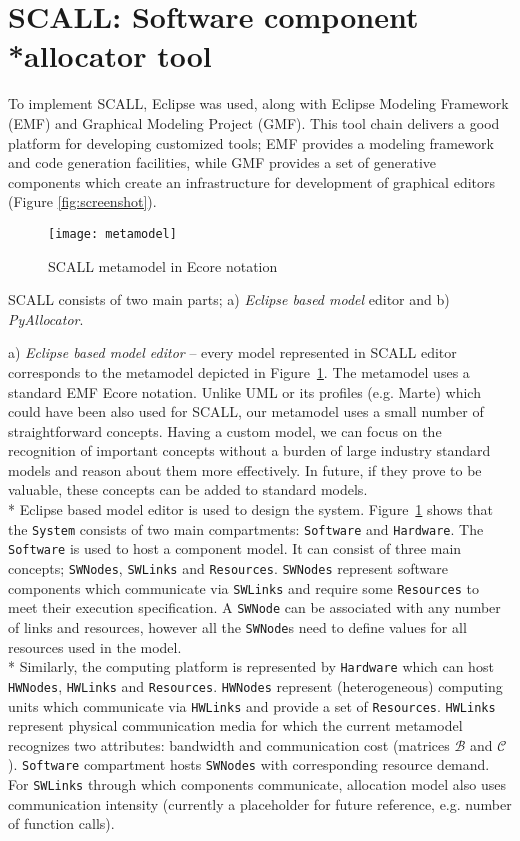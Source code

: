 \documentclass{sig-alternate}
\begin{document}
\section{SCALL: Software component \\*allocator tool}

To implement SCALL, Eclipse was used, along with Eclipse Modeling Framework (EMF) and Graphical Modeling Project (GMF). This tool chain delivers a good platform for developing customized tools; EMF provides a modeling framework and code generation facilities, while GMF provides a set of generative components which create an infrastructure for development of graphical editors (Figure \ref{fig:screenshot}). 

\begin{figure}[ht]
    \centering
		\texttt{[image: metamodel]}
    \caption{SCALL metamodel in Ecore notation}
    \label{fig:metamodel}
\end{figure}

SCALL consists of two main parts; a) \textsl{Eclipse based model} editor and b) \textsl{PyAllocator}.

 a) \textit{Eclipse based model editor} -- every model represented in SCALL editor corresponds to the metamodel depicted in Figure~\ref{fig:metamodel}. The metamodel uses a standard EMF Ecore notation. Unlike UML or its profiles (e.g. Marte) which could have been also used for SCALL, our metamodel uses a small number of straightforward concepts. Having a custom model, we can focus on the recognition of important concepts without a burden of large industry standard models and reason about them more effectively. In future, if they prove to be valuable, these concepts can be added to standard models. 
\\*
Eclipse based model editor is used to design the system. Figure~\ref{fig:metamodel} shows that the \texttt{System} consists of two main compartments: \texttt{Software} and \texttt{Hardware}. The \texttt{Software} is used to host a component model. It can consist of three main concepts; \texttt{SWNodes}, \texttt{SWLinks} and \texttt{Resources}. 
\texttt{SWNodes} represent software components which communicate via \texttt{SWLinks} and require some \texttt{Resources} to meet their execution specification. A \texttt{SWNode} can be associated with any number of links and resources, however all the \texttt{SWNode}s need to define values for all resources used in the model. \\*
Similarly, the computing platform is represented by \texttt{Hardware} which can host \texttt{HWNodes}, \texttt{HWLinks} and \texttt{Resources}. \texttt{HWNodes} represent (heterogeneous) computing units which communicate via \texttt{HWLinks} and provide a set of \texttt{Resources}. \texttt{HWLinks} represent physical communication media for which the current metamodel recognizes two attributes: bandwidth and communication cost (matrices $\mathcal{B}$ and $\mathcal{C}$). \texttt{Software} compartment hosts \texttt{SWNodes} with corresponding resource demand. For \texttt{SWLinks} through which components communicate, allocation model also uses communication intensity (currently a placeholder for future reference, e.g. number of function calls).
\end{document}

